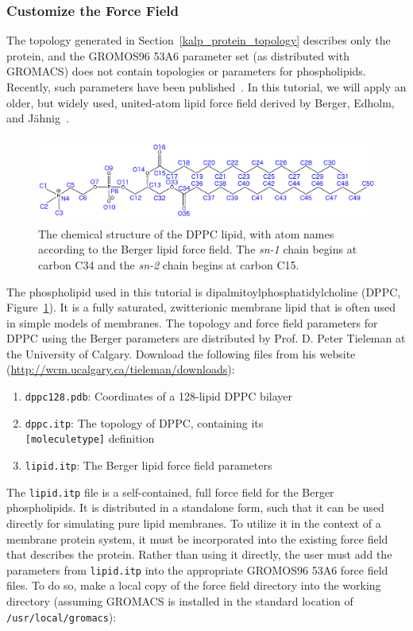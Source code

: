 \documentclass[9pt,tutorial]{livecoms}
\begin{document}
\subsubsection{Customize the Force Field} \label{kalp_ff}

The topology generated in Section~\ref{kalp_protein_topology} describes only the protein, and the GROMOS96 53A6 parameter set (as distributed with GROMACS) does not contain topologies or parameters for phospholipids. Recently, such parameters have been published~\cite{Kukol2009}. In this tutorial, we will apply an older, but widely used, united-atom lipid force field derived by Berger, Edholm, and J{\"a}hnig~\cite{Berger1997}.

\begin{figure}[h!]
\centering
\includegraphics{DPPC_new_label}
\caption{The chemical structure of the DPPC lipid, with atom names according to the Berger lipid force field. The {\em sn-1} chain begins at carbon C34 and the {\em sn-2} chain begins at carbon C15.}
\label{kalp_dppc_structure_fig}
\end{figure}

The phospholipid used in this tutorial is dipalmitoylphosphatidylcholine (DPPC, Figure~\ref{kalp_dppc_structure_fig}). It is a fully saturated, zwitterionic membrane lipid that is often used in simple models of membranes. The topology and force field parameters for DPPC using the Berger parameters are distributed by Prof. D. Peter Tieleman at the University of Calgary. Download the following files from his website (\url{http://wcm.ucalgary.ca/tieleman/downloads}):

\begin{enumerate}
	\item{\texttt{dppc128.pdb}: Coordinates of a 128-lipid DPPC bilayer}
	\item{\texttt{dppc.itp}: The topology of DPPC, containing its\\ \texttt{[moleculetype]} definition}
	\item{\texttt{lipid.itp}: The Berger lipid force field parameters}
\end{enumerate}

The \texttt{lipid.itp} file is a self-contained, full force field for the Berger phospholipids. It is distributed in a standalone form, such that it can be used directly for simulating pure lipid membranes. To utilize it in the context of a membrane protein system, it must be incorporated into the existing force field that describes the protein. Rather than using it directly, the user must add the parameters from \texttt{lipid.itp} into the appropriate GROMOS96 53A6 force field files. To do so, make a local copy of the force field directory into the working directory (assuming GROMACS is installed in the standard location of \texttt{/usr/local/gromacs}):
\end{document}
